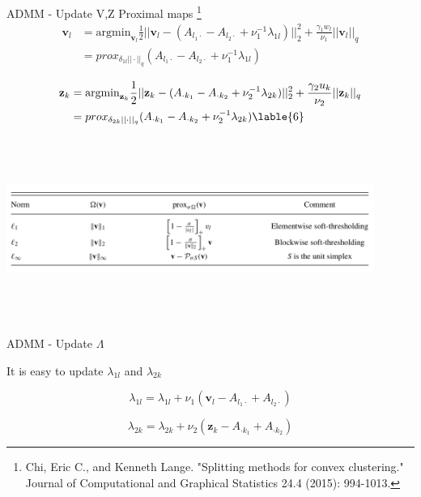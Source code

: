 \documentclass{beamer}
\begin{document}
\begin{frame}{ADMM - Update V,Z}
Proximal maps \footnote{Chi, Eric C., and Kenneth Lange. "Splitting methods for convex clustering." Journal of Computational and Graphical Statistics 24.4 (2015): 994-1013.}
    $$
    \begin{aligned}
       \mathbf{v}_l &= \text{argmin}_{\mathbf{v}_l} \frac{1}{2} ||\mathbf{v}_l - (A_{l_1 \cdot} - A_{l_2 \cdot} + \nu_1^{-1}\lambda_{1l})||_2^2 + \frac{\gamma_1 w_l}{\nu_1} ||\mathbf{v}_l ||_q \\
       & = prox_{\delta_{1l} ||\cdot||_q} (A_{l_1 \cdot} - A_{l_2 \cdot} + \nu_1^{-1}\lambda_{1l}) \label{5}
    \end{aligned}
 $$

$$
\begin{aligned}
       \mathbf{z}_k &= \text{argmin}_{\mathbf{z}_k} \frac{1}{2} ||\mathbf{z}_k - (A_{\cdot k_1 } - A_{\cdot k_2} + \nu_2^{-1}\lambda_{2k})||_2^2 + \frac{\gamma_2 u_k}{\nu_2} ||\mathbf{z}_k ||_q \\
       & = prox_{\delta_{2k} ||\cdot||_q} (A_{\cdot k_1 } - A_{\cdot k_2} + \nu_2^{-1}\lambda_{2k}) \lable{6}
    \end{aligned}
$$    
    
\centering
\includegraphics[width=12cm,height=6cm,keepaspectratio]{prox}
    
\end{frame}


\begin{frame}{ADMM - Update $\Lambda$}
    
    It is easy to update $\lambda_{1l}$ and $\lambda_{2k}$ 
    
    \begin{equation}
        \lambda_{1l} = \lambda_{1l} + \nu_1 (\mathbf{v}_l - A_{l_1 \cdot} + A_{l_2 \cdot}) \tag{7}
    \end{equation}
    
    \begin{equation}
        \lambda_{2k} = \lambda_{2k} + \nu_2 (\mathbf{z}_k - A_{\cdot k_1 } + A_{\cdot k_2}) \tag{8}
    \end{equation}
    
\end{frame}
\end{document}
